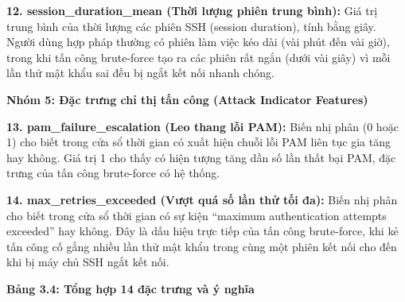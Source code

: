 \documentclass[
  a4paper]{report}
\begin{document}
\textbf{12. session\_duration\_mean (Thời lượng phiên trung bình):} Giá
trị trung bình của thời lượng các phiên SSH (session duration), tính
bằng giây. Người dùng hợp pháp thường có phiên làm việc kéo dài (vài
phút đến vài giờ), trong khi tấn công brute-force tạo ra các phiên rất
ngắn (dưới vài giây) vì mỗi lần thử mật khẩu sai đều bị ngắt kết nối
nhanh chóng.

\textbf{Nhóm 5: Đặc trưng chỉ thị tấn công (Attack Indicator Features)}

\textbf{13. pam\_failure\_escalation (Leo thang lỗi PAM):} Biến nhị phân
(0 hoặc 1) cho biết trong cửa sổ thời gian có xuất hiện chuỗi lỗi PAM
liên tục gia tăng hay không. Giá trị 1 cho thấy có hiện tượng tăng dần
số lần thất bại PAM, đặc trưng của tấn công brute-force có hệ thống.

\textbf{14. max\_retries\_exceeded (Vượt quá số lần thử tối đa):} Biến
nhị phân cho biết trong cửa sổ thời gian có sự kiện ``maximum
authentication attempts exceeded'' hay không. Đây là dấu hiệu trực tiếp
của tấn công brute-force, khi kẻ tấn công cố gắng nhiều lần thử mật khẩu
trong cùng một phiên kết nối cho đến khi bị máy chủ SSH ngắt kết nối.

\textbf{Bảng 3.4: Tổng hợp 14 đặc trưng và ý nghĩa}
\end{document}
